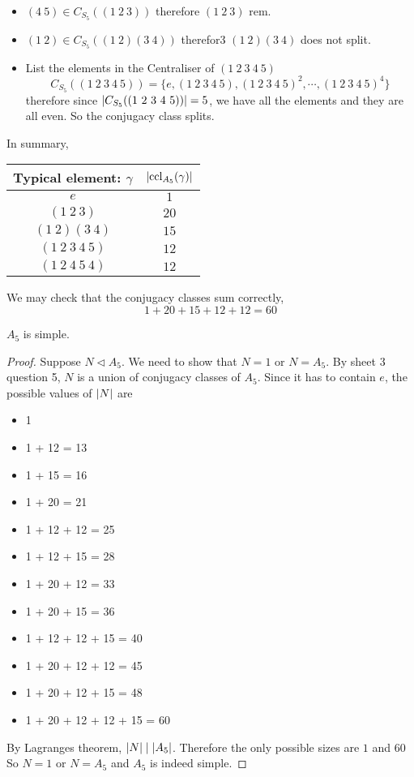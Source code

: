 \documentclass{article}
\begin{document}
\begin{eg}[Conjugacy in $A_n$]\leavevmode
    \begin{itemize}
        \item $(4\ 5) \in C_{S_5}((1\ 2\ 3))$ therefore $(1\ 2\ 3)$ rem.
        \item $(1\ 2) \in C_{S_5}((1\ 2)(3\ 4))$ therefor3 $(1\ 2)(3\ 4)$ does not split.
        \item List the elements in the Centraliser of $(1\ 2\ 3\ 4\ 5)$
        \[
            C_{S_5}((1\ 2\ 3\ 4\ 5)) = \{e, (1\ 2\ 3\ 4\ 5), (1\ 2\ 3\ 4\ 5)^2, \cdots, (1\ 2\ 3\ 4\ 5)^4\}
        \]
        therefore since $\abs{C_{S_5}((1\ 2\ 3\ 4\ 5))} = 5$, we have all the elements and they are all even.
        So the conjugacy class splits.
    \end{itemize}
    In summary,
    \begin{center}
    \begin{tabular}{c | c}
        Typical element: $\gamma$ & $\left\lvert \operatorname{ccl}_{A_5}(\gamma)\right\rvert$ \\
        \hline
        $e$ & $1$ \\
        $(1\ 2\ 3)$ & $20$ \\
        $(1\ 2)(3\ 4)$ & $15$ \\
        $(1\ 2\ 3\ 4\ 5)$ & $12$ \\
        $(1\ 2\ 4\ 5\ 4)$ & $12$
    \end{tabular}
    \end{center}
    We may check that the conjugacy classes sum correctly,
    \[
        1 + 20 + 15 + 12 + 12 = 60  
    \]
\end{eg}

\begin{thm}[$A_5$ is simple]
    $A_5$ is simple.
\end{thm}
\begin{proof}
    Suppose $N \triangleleft A_5$. We need to show that $N = 1$ or $N = A_5$. 
    By sheet 3 question 5, $N$ is a union of conjugacy classes of $A_5$. Since it has to contain $e$, the possible values of $\left\lvert N\right\rvert$ are
    \begin{itemize}
        \item 1
        \item 1 + 12 = 13
        \item 1 + 15 = 16
        \item 1 + 20 = 21
        \item 1 + 12 + 12 = 25
        \item 1 + 12 + 15 = 28
        \item 1 + 20 + 12 = 33
        \item 1 + 20 + 15 = 36
        \item 1 + 12 + 12 + 15 = 40 
        \item 1 + 20 + 12 + 12 = 45
        \item 1 + 20 + 12 + 15 = 48
        \item 1 + 20 + 12 + 12 + 15 = 60
    \end{itemize}
    By Lagranges theorem, $\left\lvert N\right\rvert \mid \left\lvert A_5\right\rvert$. Therefore the only possible sizes are $1$ and $60$
    So $N = 1$ or $N = A_5$ and $A_5$ is indeed simple.
\end{proof}
\end{document}
